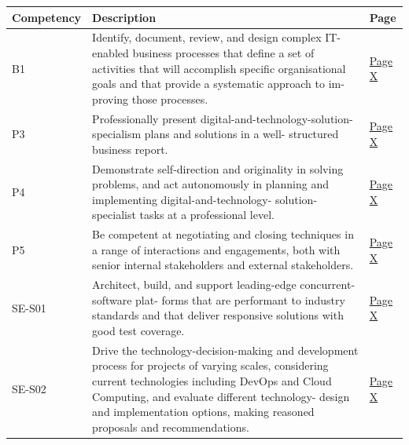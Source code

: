     \begin{longtable}{|p{2.5cm}|p{10cm}|p{1.5cm}|}
      \hline
      \textbf{Competency} & \textbf{Description} & \textbf{Page} \\ \hline
      B1                  & Identify, document, review, and design complex IT-enabled business
                            processes that define a set of activities that will accomplish specific
                            organisational goals and that provide a systematic approach to im-
                            proving those processes. & \hyperref[sec:cicd]{Page X} \\ \hline

      P3                  & Professionally present digital-and-technology-solution-specialism plans
                            and solutions in a well- structured business report. & \hyperref[sec:cicd]{Page X} \\ \hline

      P4                  & Demonstrate self-direction and originality in solving problems, and
                            act autonomously in planning and implementing digital-and-technology-
                            solution-specialist tasks at a professional level. & \hyperref[sec:cicd]{Page X} \\ \hline

      P5                  & Be competent at negotiating and closing techniques in a range of
                            interactions and engagements, both with senior internal stakeholders
                            and external stakeholders. & \hyperref[sec:cicd]{Page X} \\ \hline

      SE-S01              & Architect, build, and support leading-edge concurrent-software plat-
                            forms that are performant to industry standards and that deliver
                            responsive solutions with good test coverage. & \hyperref[sec:cicd]{Page X} \\ \hline

      SE-S02              & Drive the technology-decision-making and development process for
                            projects of varying scales, considering current technologies including
                            DevOps and Cloud Computing, and evaluate different technology-
                            design and implementation options, making reasoned proposals and
                            recommendations. & \hyperref[sec:cicd]{Page X} \\ \hline


\end{longtable}
